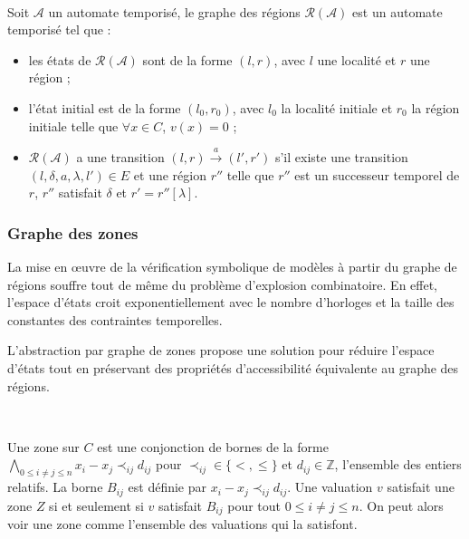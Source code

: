         ~

        Soit $\mathcal{A}$ un automate temporisé, le graphe des régions
        $\mathcal{R}(\mathcal{A})$ est un automate temporisé tel que :
      
        \begin{itemize}
          \item les états de $\mathcal{R}(\mathcal{A})$ sont de la forme
            $(l,r)$, avec $l$ une localité et $r$ une région ;
          \item l'état initial est de la forme $(l_0,r_0)$, avec $l_0$ la
            localité initiale et $r_0$ la région initiale telle que $\forall x
            \in C$, $v(x) = 0$ ;
          \item $\mathcal{R}(\mathcal{A})$ a une transition
            $(l,r)\xrightarrow{a}(l',r')$ s'il existe une transition
            $(l,\delta,a,\lambda,l') \in E$ et une région $r''$ telle que $r''$
            est un successeur temporel de $r$, $r''$ satisfait $\delta$ et $r' =
            r''[\lambda]$.
        \end{itemize}

      \subsubsection{Graphe des zones}
    
        La mise en \oe uvre de la vérification symbolique de modèles à partir du
        graphe de régions souffre tout de même du problème d'explosion
        combinatoire. En effet, l'espace d'états croit exponentiellement avec le
        nombre d'horloges et la taille des constantes des contraintes
        temporelles.
      
        L'abstraction par graphe de zones \cite{daws98} propose une solution
        pour réduire l'espace d'états tout en préservant des propriétés
        d'accessibilité équivalente au graphe des régions.
      
        ~

        Une zone sur $C$ est une conjonction de bornes de la forme $\bigwedge_{0
          \le i \neq j \le n} x_i - x_j \prec_{ij} d_{ij}$ pour $\prec_{ij} \in
        \{ <, \le \}$ et $d_{ij} \in \mathbb{Z}$, l'ensemble des entiers
        relatifs. La borne $B_{ij}$ est définie par $x_i - x_j \prec_{ij}
        d_{ij}$. Une valuation $v$ satisfait une zone $Z$ si et seulement si
        $v$ satisfait $B_{ij}$ pour tout $0 \le i \neq j \le n$. On peut alors
        voir une zone comme l'ensemble des valuations qui la satisfont.

